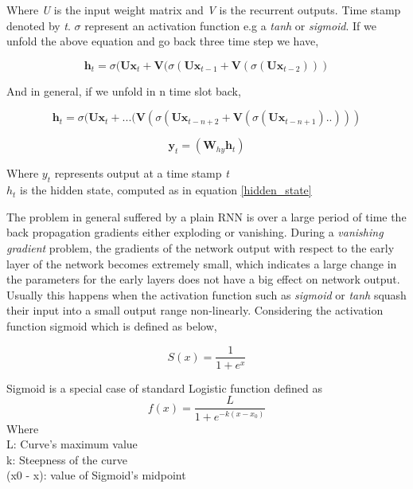 Where \textit{U} is the input weight matrix and \textit{V} is the recurrent outputs. Time stamp denoted by \textit{t}. $\sigma$ represent an activation function e.g a \textit{tanh} or \textit{sigmoid}. If we unfold the above equation and go back three time step we have,

\begin{equation}
	\textbf{h}_t = \sigma (\textbf{Ux}_t + \textbf{V}(\sigma(\textbf{Ux}_{t-1} + \textbf{V}(\sigma(\textbf{Ux}_{t-2})))
\end{equation}

And in general, if we unfold in n time slot back,

\begin{equation}
\textbf{h}_t = \sigma (\textbf{Ux}_t + ...( \textbf{V}(\sigma(\textbf{Ux}_{t-n+2} + \textbf{V}(\sigma(\textbf{Ux}_{t-n+1})..)))
\end{equation}

\begin{equation}
	\textbf{y}_t = (\textbf{W}_{hy}  \textbf{h}_{t}) 
\end{equation}

Where \textbf{$y_t$}  represents output at a time stamp \textit{t} \\
\textbf{$h_t$} is the hidden state, computed as in equation \ref{hidden_state}

The problem in general suffered by a plain RNN is over a large period of time the back propagation gradients either exploding or vanishing. During a \textit{vanishing gradient } problem, the gradients of the network output with respect to the early layer of the network becomes extremely small, which indicates a large change in the parameters for the early layers does not have a big effect on network output. Usually this happens when the activation function such as \textit{sigmoid} or \textit{tanh} squash their input into a small output range non-linearly. Considering the activation function sigmoid which is defined as below,

\begin{equation}
	S(x) = \frac{1}{ 1+ e^x}
\end{equation}

Sigmoid is a special case of standard Logistic function defined as 
\begin{equation}
f(x) = \frac{L}{ 1+ e^{-k(x-x_0)}}
\end{equation}
Where \\
L: Curve's maximum value \\
k: Steepness of the curve \\
(x0 - x): value of Sigmoid's midpoint \\

